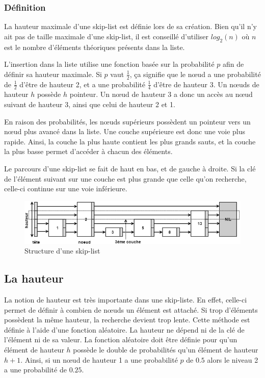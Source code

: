 \documentclass[hidelinks,a4paper, 12pt]{article}
\begin{document}
	\subsubsection*{Définition}
	La hauteur maximale d'une skip-list est définie lors de sa création. Bien qu'il n'y ait pas de taille maximale d'une skip-list, il est conseillé d'utiliser $log_2(n)$ où $n$ est le nombre d'éléments théoriques présents dans la liste.
	
	L'insertion dans la liste utilise une fonction basée sur la probabilité $p$ afin de définir sa hauteur maximale. Si $p$ vaut $\frac{1}{2}$, ça signifie que le nœud a une probabilité de $\frac{1}{2}$ d'être de hauteur 2, et a une probabilité $\frac{1}{4}$ d'être de hauteur 3. Un nœuds de hauteur $h$ possède $h$ pointeur. Un nœud de hauteur 3 a donc un accès au nœud suivant de hauteur 3, ainsi que celui de hauteur 2 et 1.
	
	En raison des probabilités, les nœuds supérieurs possèdent un pointeur vers un nœud plus avancé dans la liste. Une couche supérieure est donc une voie plus rapide. Ainsi, la couche la plus haute contient les plus grands sauts, et la couche la plus basse permet d'accéder à chacun des éléments.
		
	Le parcours d'une skip-list se fait de haut en bas, et de gauche à droite. Si la clé de l'élément suivant sur une couche est plus grande que celle qu'on recherche, celle-ci continue sur une voie inférieure.	
	
	\begin{figure}[h]
		\includegraphics[width=\textwidth]{img/struct}
		\caption{Structure d'une skip-list}
		\label{StructSkip}
	\end{figure}
	
	\subsection{La hauteur}
	La notion de hauteur est très importante dans une skip-liste. En effet, celle-ci permet de définir à combien de nœuds un élément est attaché. Si trop d'éléments possèdent la même hauteur, la recherche devient trop lente.	Cette méthode est définie à l'aide d'une fonction aléatoire. La hauteur ne dépend ni de la clé de l'élément ni de sa valeur. La fonction aléatoire doit être définie pour qu'un élément de hauteur $h$ possède le double de probabilités qu'un élément de hauteur $h+1$. Ainsi, si un nœud de hauteur 1 a une probabilité $p$ de $0.5$ alors le niveau 2 a une probabilité de $0.25$.
		
\end{document}
